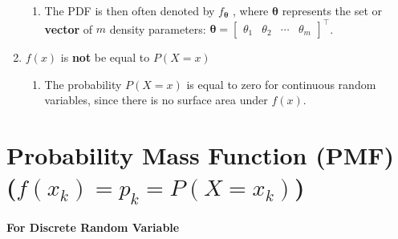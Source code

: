 \begin{enumerate}
\begin{enumerate}
        \item The PDF is then often denoted by $f_{\bm{\theta}}$ , where $\bm{\theta}$ represents the set or \textbf{vector} of $m$ density parameters: 
        $\bm{\theta} = 
        \begin{bmatrix}
            \theta_1 & \theta_2 & \cdots &\theta_m
        \end{bmatrix} 
        ^\top
        $.
        \hfill \cite{statistics/book/Statistics-for-Data-Scientists/Maurits-Kaptein}
    \end{enumerate}

    \item  $f(x)$ is \textbf{not} be equal to $P(X = x)$
    \hfill \cite{statistics/book/Statistics-for-Data-Scientists/Maurits-Kaptein}
    \begin{enumerate}
        \item The probability $P(X = x)$ is equal to zero for continuous random variables, since there is no surface area under $f (x)$.
        \hfill \cite{statistics/book/Statistics-for-Data-Scientists/Maurits-Kaptein}
    \end{enumerate}
\end{enumerate}





\section{Probability Mass Function (PMF) ($f(x_k) = p_k = P(X = x_k)$)}

\textbf{For Discrete Random Variable}


